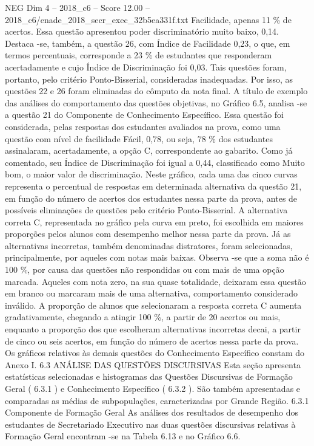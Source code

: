 \begin{textsample}{NEG Dim 4 – 2018\_c6 – Score 12.00 – 2018\_c6/enade\_2018\_secr\_exec\_32b5ea331f.txt}
Facilidade, apenas 11 \% de acertos.
Essa questão apresentou poder discriminatório muito baixo, 0,14.
Destaca -se, também, a questão 26, com Índice de Facilidade 0,23, o que, em termos percentuais, corresponde a 23 \% de estudantes que responderam acertadamente e cujo Índice de Discriminação foi 0,03.
Tais questões foram, portanto, pelo critério Ponto-Bisserial, consideradas inadequadas.
Por isso, as questões 22 e 26 foram eliminadas do cômputo da nota final.
A título de exemplo das análises do comportamento das questões objetivas, no Gráfico 6.5, analisa -se a questão 21 do Componente de Conhecimento Específico.
Essa questão foi considerada, pelas respostas dos estudantes avaliados na prova, como uma questão com nível de facilidade Fácil, 0,78, ou seja, 78 \% dos estudantes assinalaram, acertadamente, a opção C, correspondente ao gabarito.
Como já comentado, seu Índice de Discriminação foi igual a 0,44, classificado como Muito bom, o maior valor de discriminação.
Neste gráfico, cada uma das cinco curvas representa o percentual de respostas em determinada alternativa da questão 21, em função do número de acertos dos estudantes nessa parte da prova, antes de possíveis eliminações de questões pelo critério Ponto-Bisserial.
A alternativa correta C, representada no gráfico pela curva em preto, foi escolhida em maiores proporções pelos alunos com desempenho melhor nessa parte da prova.
Já as alternativas incorretas, também denominadas distratores, foram selecionadas, principalmente, por aqueles com notas mais baixas.
Observa -se que a soma não é 100 \%, por causa das questões não respondidas ou com mais de uma opção marcada.
Aqueles com nota zero, na sua quase totalidade, deixaram essa questão em branco ou marcaram mais de uma alternativa, comportamento considerado inválido.
A proporção de alunos que selecionaram a resposta correta C aumenta gradativamente, chegando a atingir 100 \%, a partir de 20 acertos ou mais, enquanto a proporção dos que escolheram alternativas incorretas decai, a partir de cinco ou seis acertos, em função do número de acertos nessa parte da prova.
Os gráficos relativos às demais questões do Conhecimento Específico constam do Anexo I. 6.3 ANÁLISE DAS QUESTÕES DISCURSIVAS Esta seção apresenta estatísticas selecionadas e histogramas das Questões Discursivas de Formação Geral ( 6.3.1 ) e Conhecimento Específico ( 6.3.2 ).
São também apresentadas e comparadas as médias de subpopulações, caracterizadas por Grande Região. 6.3.1 Componente de Formação Geral As análises dos resultados de desempenho dos estudantes de Secretariado Executivo nas duas questões discursivas relativas à Formação Geral encontram -se na Tabela 6.13 e no Gráfico 6.6.

\end{textsample}

